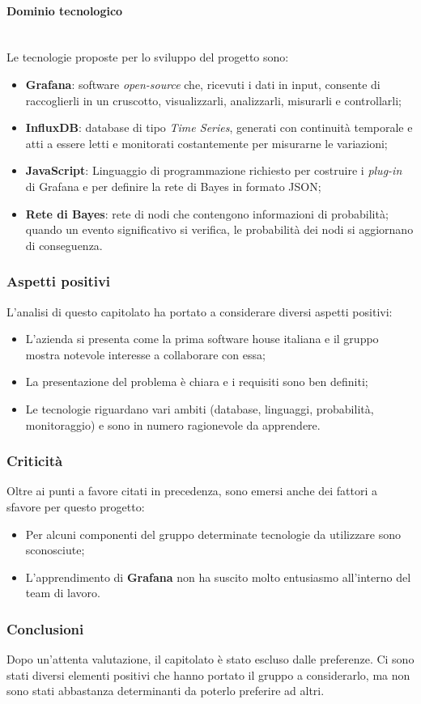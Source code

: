 \paragraph {Dominio tecnologico} \mbox{} \\
Le tecnologie proposte per lo sviluppo del progetto sono:
\begin{itemize}
	\item \textbf{Grafana}: software \textit{open-source} che, ricevuti i dati in 
input,
	 consente di raccoglierli in un cruscotto, visualizzarli, analizzarli, 
	 misurarli e controllarli;
	\item \textbf{InfluxDB}: database di tipo \textit{Time Series}, generati con 
continuità
	 temporale e atti a essere letti e monitorati costantemente per misurarne 
	 le variazioni;
	\item \textbf{JavaScript}: Linguaggio di programmazione richiesto per costruire i \textit{plug-in} di Grafana e per definire la rete di Bayes in formato JSON\glo;
	\item \textbf{Rete di Bayes}: rete di nodi che contengono informazioni di 
probabilità; quando un evento significativo si verifica, le probabilità dei nodi si aggiornano di conseguenza.
\end{itemize}
\subsubsection{Aspetti positivi}
L'analisi di questo capitolato ha portato a considerare diversi aspetti 
positivi:
\begin{itemize}
	\item L'azienda si presenta come la prima software house italiana e il gruppo 
mostra 
	notevole interesse a collaborare con essa;
	\item La presentazione del problema è chiara e i requisiti sono ben definiti;
	\item Le tecnologie riguardano vari ambiti (database, linguaggi, probabilità, 
	monitoraggio) e sono in numero ragionevole da apprendere.
\end{itemize}
\subsubsection{Criticità}
Oltre ai punti a favore citati in precedenza, sono emersi anche dei fattori a 
sfavore per
questo progetto:
\begin{itemize}
	\item Per alcuni componenti del gruppo determinate tecnologie da  utilizzare 
	sono sconosciute;
	\item L'apprendimento di \textbf{Grafana} non ha suscito molto 
	entusiasmo all'interno del team di lavoro.
\end{itemize}
\subsubsection{Conclusioni}
Dopo un'attenta valutazione, il capitolato è stato escluso dalle preferenze. Ci 
sono stati diversi elementi positivi che hanno portato il gruppo a considerarlo,
ma non sono stati abbastanza determinanti da poterlo preferire ad altri.


